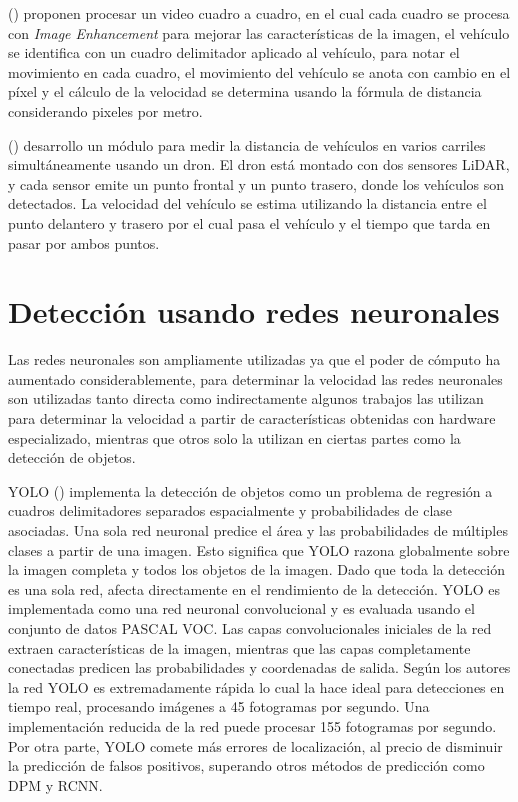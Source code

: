 \citeauthor{kamoji2020Image} (\cite{kamoji2020Image}) proponen procesar un video cuadro a cuadro, en el cual cada cuadro se procesa con \textit{Image Enhancement} para mejorar las características de la imagen, el vehículo se identifica con un cuadro delimitador aplicado al vehículo, para notar el movimiento en cada cuadro, el movimiento del vehículo se anota con cambio en el píxel y el cálculo de la velocidad se determina usando la fórmula de distancia considerando pixeles por metro. 

\citeauthor{lee2021Study} (\cite{lee2021Study}) desarrollo un módulo para medir la distancia de vehículos en varios carriles simultáneamente usando un dron. El dron está montado con dos sensores LiDAR, y cada sensor emite un punto frontal y un punto trasero, donde los vehículos son detectados. La velocidad del vehículo se estima utilizando la distancia entre el punto delantero y trasero por el cual pasa el vehículo y el tiempo que tarda en pasar por ambos puntos. 

\section{Detección usando redes neuronales}

Las redes neuronales son ampliamente utilizadas ya que el poder de cómputo ha aumentado considerablemente, para determinar la velocidad las redes neuronales son utilizadas tanto directa como indirectamente algunos trabajos las utilizan para determinar la velocidad a partir de características obtenidas con hardware especializado, mientras que otros solo la utilizan en ciertas partes como la detección de objetos. 

YOLO (\cite{redmon2016Yolo}) implementa la detección de objetos como un problema de regresión a cuadros delimitadores separados espacialmente y probabilidades de clase asociadas. Una sola red neuronal predice el área y las probabilidades de múltiples clases a partir de una imagen. Esto significa que YOLO razona globalmente sobre la imagen completa y todos los objetos de la imagen. Dado que toda la detección es una sola red, afecta directamente en el rendimiento de la detección. YOLO es implementada como una red neuronal convolucional y es evaluada usando el conjunto de datos PASCAL VOC. Las capas convolucionales iniciales de la red extraen características de la imagen, mientras que las capas completamente conectadas predicen las probabilidades y coordenadas de salida. Según los autores la red YOLO es extremadamente rápida lo cual la hace ideal para detecciones en tiempo real, procesando imágenes a 45 fotogramas por segundo. Una implementación reducida de la red puede procesar 155 fotogramas por segundo. Por otra parte, YOLO comete más errores de localización, al precio de disminuir la predicción de falsos positivos, superando otros métodos de predicción como DPM y RCNN. 

